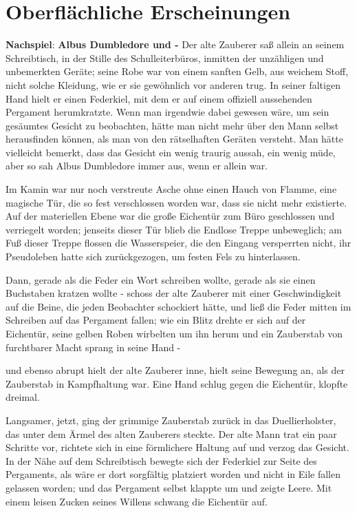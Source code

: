\chapter{Oberflächliche Erscheinungen}

\textbf{Nachspiel}: \textbf{Albus Dumbledore und - } Der alte Zauberer saß
allein an seinem Schreibtisch, in der Stille des Schulleiterbüros, inmitten der
unzähligen und unbemerkten Geräte; seine Robe war von einem sanften Gelb, aus
weichem Stoff, nicht solche Kleidung, wie er sie gewöhnlich vor anderen trug. In
seiner faltigen Hand hielt er einen Federkiel, mit dem er auf einem offiziell
aussehenden Pergament herumkratzte. Wenn man irgendwie dabei gewesen wäre, um
sein gesäumtes Gesicht zu beobachten, hätte man nicht mehr über den Mann selbst
herausfinden können, als man von den rätselhaften Geräten versteht. Man hätte
vielleicht bemerkt, dass das Gesicht ein wenig traurig aussah, ein wenig müde,
aber so sah Albus Dumbledore immer aus, wenn er allein war.

Im Kamin war nur noch verstreute Asche ohne einen Hauch von Flamme, eine
magische Tür, die so fest verschlossen worden war, dass sie nicht mehr
existierte. Auf der materiellen Ebene war die große Eichentür zum Büro
geschlossen und verriegelt worden; jenseits dieser Tür blieb die Endlose Treppe
unbeweglich; am Fuß dieser Treppe flossen die Wasserspeier, die den Eingang
versperrten nicht, ihr Pseudoleben hatte sich zurückgezogen, um festen Fels zu
hinterlassen.

Dann, gerade als die Feder ein Wort schreiben wollte, gerade als sie einen
Buchstaben kratzen wollte - schoss der alte Zauberer mit einer Geschwindigkeit
auf die Beine, die jeden Beobachter schockiert hätte, und ließ die Feder mitten
im Schreiben auf das Pergament fallen; wie ein Blitz drehte er sich auf der
Eichentür, seine gelben Roben wirbelten um ihn herum und ein Zauberstab von
furchtbarer Macht sprang in seine Hand -

und ebenso abrupt hielt der alte Zauberer inne, hielt seine Bewegung an, als der
Zauberstab in Kampfhaltung war. Eine Hand schlug gegen die Eichentür, klopfte
dreimal.

Langsamer, jetzt, ging der grimmige Zauberstab zurück in das Duellierholster,
das unter dem Ärmel des alten Zauberers steckte. Der alte Mann trat ein paar
Schritte vor, richtete sich in eine förmlichere Haltung auf und verzog das
Gesicht. In der Nähe auf dem Schreibtisch bewegte sich der Federkiel zur Seite
des Pergaments, als wäre er dort sorgfältig platziert worden und nicht in Eile
fallen gelassen worden; und das Pergament selbst klappte um und zeigte Leere.
Mit einem leisen Zucken seines Willens schwang die Eichentür auf.

